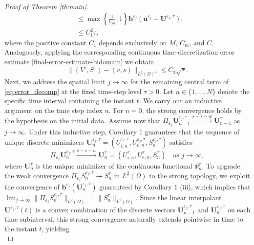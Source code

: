 \documentclass[a4paper,11pt]{article}
\theoremstyle{definition}
\numberwithin{equation}{section}
\begin{document}
\begin{proof}[Proof of Theorem \ref{th:main}]
\begin{equation}
\begin{aligned}
		&\leq \max\left\{\frac{1}{C_m},1\right\}\mathbf{b}^{\varepsilon_j}(\mathbf{u}^{\varepsilon_j}-{\mathbf{U}}^{\varepsilon_j, \tau}),\\
		& \leq C_1^2 \tau,
	\end{aligned}
\end{equation}
where the positive constant $C_1$ depends exclusively on $M$, $C_m$, and $C$. Analogously, applying the corresponding continuous time-discretization error estimate \eqref{final-error-estimate-bidomain} we obtain
\begin{equation}
	\label{eq:c2tau}
	\|(V^{\tau},S^{\tau}) - (v,s)\|_{L^2(\Omega)^2}
	\leq C_2 \sqrt\tau.
\end{equation}
Next, we address the spatial limit $j \to \infty$ for the remaining central term of \eqref{eq:error_decomp} at the fixed time-step level $\tau > 0$. Let $n \in \{1, \dots, N\}$ denote the specific time interval containing the instant $t$. We carry out an inductive argument on the time step index $n$. For $n=0$, the strong convergence holds by the hypothesis on the initial data. Assume now that $\Pi_{\varepsilon_j} \mathbf{U}_{n-1}^{\varepsilon_j,\tau} \xrightarrow{s-s-w} \mathbf{U}_{n-1}^\tau$ as $j \to \infty$. Under this inductive step, Corollary 1 guarantees that the sequence of unique discrete minimizers $\mathbf{U}_n^{\varepsilon_j,\tau} = (U_{i,n}^{\varepsilon_j,\tau}, U_{e,n}^{\varepsilon_j,\tau}, S_n^{\varepsilon_j,\tau})$ satisfies
\begin{equation*}
	\Pi_{\varepsilon_j} \mathbf{U}_n^{\varepsilon_j,\tau} \xrightarrow{s-s-w} \mathbf{U}_n^\tau = (U_{i,n}^\tau, U_{e,n}^\tau, S_n^\tau) \quad \text{as } j \to \infty,
\end{equation*}
where $\mathbf{U}_n^\tau$ is the unique minimizer of the continuous functional $\Psi_n^\tau$. To upgrade the weak convergence $\Pi_{\varepsilon_j} S_n^{\varepsilon_j,\tau} \rightharpoonup S_n^\tau$ in $L^2(\Omega)$ to the strong topology, we exploit the convergence of $\mathbf{b}^{\varepsilon_j}(\mathbf{U}_n^{\varepsilon_j,\tau})$ guaranteed by Corollary 1 (iii), which implies that $\lim_{j \to \infty} \|\Pi_{\varepsilon_j} S^{\varepsilon_j,\tau}_n\|_{L^2(\Omega)} = \|S_n^\tau\|_{L^2(\Omega)}.$ 
Since the linear interpolant $\mathbf{U}^{\varepsilon_j, \tau}(t)$ is a convex combination of the discrete vectors $\mathbf{U}_{n-1}^{\varepsilon_j,\tau}$ and $\mathbf{U}_n^{\varepsilon_j,\tau}$ on each time subinterval, this strong convergence naturally extends pointwise in time to the instant $t$, yielding
\begin{equation}

\end{equation}
\end{proof}
\end{document}
